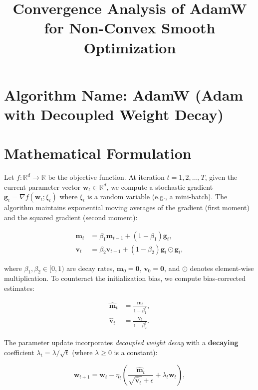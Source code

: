\documentclass{article}
\title{Convergence Analysis of AdamW for Non-Convex Smooth Optimization}
\author{}
\date{}
\theoremstyle{plain}
\theoremstyle{definition}
\renewcommand{\vec}[1]{\boldsymbol{#1}}
\newcommand{\R}{\mathbb{R}}
\begin{document}
\maketitle

\section*{Algorithm Name: AdamW (Adam with Decoupled Weight Decay)}

\section*{Mathematical Formulation}

Let $f: \R^d \to \R$ be the objective function. At iteration $t = 1, 2, \dots, T$, given the current parameter vector $\vec{w}_t \in \R^d$, we compute a stochastic gradient $\vec{g}_t = \nabla f(\vec{w}_t; \xi_t)$ where $\xi_t$ is a random variable (e.g., a mini-batch). The algorithm maintains exponential moving averages of the gradient (first moment) and the squared gradient (second moment):

\begin{align}
    \vec{m}_t &= \beta_1 \vec{m}_{t-1} + (1 - \beta_1) \vec{g}_t, \label{eq:m_update} \\
    \vec{v}_t &= \beta_2 \vec{v}_{t-1} + (1 - \beta_2) \vec{g}_t \odot \vec{g}_t, \label{eq:v_update}
\end{align}

where $\beta_1, \beta_2 \in [0,1)$ are decay rates, $\vec{m}_0 = \vec{0}$, $\vec{v}_0 = \vec{0}$, and $\odot$ denotes element-wise multiplication. To counteract the initialization bias, we compute bias-corrected estimates:

\begin{align}
    \hat{\vec{m}}_t &= \frac{\vec{m}_t}{1 - \beta_1^t}, \label{eq:m_hat} \\
    \hat{\vec{v}}_t &= \frac{\vec{v}_t}{1 - \beta_2^t}. \label{eq:v_hat}
\end{align}

The parameter update incorporates \textit{decoupled weight decay} with a \textbf{decaying} coefficient $\lambda_t = \lambda / \sqrt{t}$ (where $\lambda \ge 0$ is a constant):

\begin{equation}
    \vec{w}_{t+1} = \vec{w}_t - \eta_t \left( \frac{\hat{\vec{m}}_t}{\sqrt{\hat{\vec{v}}_t} + \epsilon} + \lambda_t \vec{w}_t \right), \label{eq:update}
\end{equation}
\end{document}
